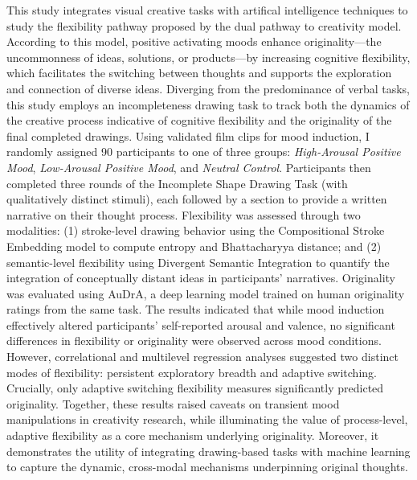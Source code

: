 \documentclass[../MA_Thesis.tex]{subfiles}
\begin{document}
This study integrates visual creative tasks with artifical intelligence techniques to study the flexibility pathway proposed by the dual pathway to creativity model. According to this model, positive activating moods enhance originality—the uncommonness of ideas, solutions, or products—by increasing cognitive flexibility, which facilitates the switching between thoughts and supports the exploration and connection of diverse ideas. Diverging from the predominance of verbal tasks, this study employs an incompleteness drawing task to track both the dynamics of the creative process indicative of cognitive flexibility and the originality of the final completed drawings. Using validated film clips for mood induction, I randomly assigned 90 participants to one of three groups: \textit{High-Arousal Positive Mood}, \textit{Low-Arousal Positive Mood}, and \textit{Neutral Control}. Participants then completed three rounds of the Incomplete Shape Drawing Task (with qualitatively distinct stimuli), each followed by a section to provide a written narrative on their thought process. Flexibility was assessed through two modalities: (1) stroke-level drawing behavior using the Compositional Stroke Embedding model to compute entropy and Bhattacharyya distance; and (2) semantic-level flexibility using Divergent Semantic Integration to quantify the integration of conceptually distant ideas in participants’ narratives. Originality was evaluated using AuDrA, a deep learning model trained on human originality ratings from the same task. The results indicated that while mood induction effectively altered participants’ self-reported arousal and valence, no significant differences in flexibility or originality were observed across mood conditions. However, correlational and multilevel regression analyses suggested two distinct modes of flexibility: persistent exploratory breadth and adaptive switching. Crucially, only adaptive switching flexibility measures significantly predicted originality. Together, these results raised caveats on transient mood manipulations in creativity research, while illuminating the value of process-level, adaptive flexibility as a core mechanism underlying originality. Moreover, it demonstrates the utility of integrating drawing-based tasks with machine learning to capture the dynamic, cross-modal mechanisms underpinning original thoughts.
\end{document}
